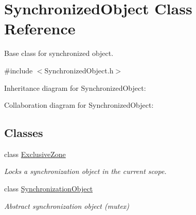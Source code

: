 \hypertarget{class_synchronized_object}{\section{Synchronized\+Object Class Reference}
\label{class_synchronized_object}
}


Base class for synchronized object.  




{\ttfamily \#include $<$Synchronized\+Object.\+h$>$}



Inheritance diagram for Synchronized\+Object\+:


Collaboration diagram for Synchronized\+Object\+:
\subsection*{Classes}
\begin{DoxyCompactItemize}
\item 
class \hyperlink{class_synchronized_object_1_1_exclusive_zone}{Exclusive\+Zone}
\begin{DoxyCompactList}\small\item\em Locks a synchronization object in the current scope. \end{DoxyCompactList}\item 
class \hyperlink{class_synchronized_object_1_1_synchronization_object}{Synchronization\+Object}
\begin{DoxyCompactList}\small\item\em Abstract synchronization object (mutex) \end{DoxyCompactList}\end{DoxyCompactItemize}
